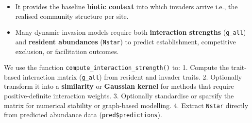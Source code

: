 \documentclass[
]{article}
\providecommand{\tightlist}{%
  \setlength{\itemsep}{0pt}\setlength{\parskip}{0pt}}
\begin{document}
\begin{itemize}
\tightlist
\item
  It provides the baseline \textbf{biotic context} into which invaders
  arrive i.e., the realised community structure per site.
\item
  Many dynamic invasion models require both \textbf{interaction
  strengths} (\texttt{g\_all}) and \textbf{resident abundances}
  (\texttt{Nstar}) to predict establishment, competitive exclusion, or
  facilitation outcomes.
\end{itemize}

We use the function \texttt{compute\_interaction\_strength()} to: 1.
Compute the trait-based interaction matrix (\texttt{g\_all}) from
resident and invader traits. 2. Optionally transform it into a
\textbf{similarity} or \textbf{Gaussian kernel} for methods that require
positive-definite interaction weights. 3. Optionally standardise or
sparsify the matrix for numerical stability or graph-based modelling. 4.
Extract \texttt{Nstar} directly from predicted abundance data
(\texttt{pred\$predictions}).
\end{document}
